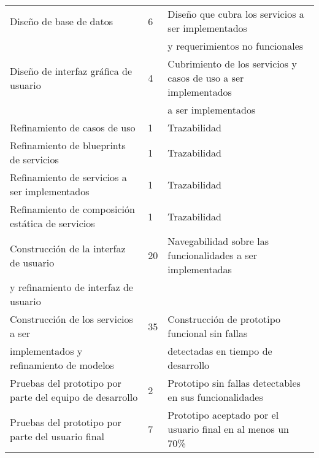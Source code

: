 \begin{table}[h]
\begin{center}
{\begin{tabular}{|l|l|l|}
        
        Diseño de base de datos & 6 & Diseño que cubra los servicios a ser implementados \\ 
        
         &  &  y requerimientos no funcionales \\ 
        
        Diseño de interfaz gráfica de usuario & 4 & Cubrimiento de los servicios y casos de uso a ser implementados \\ 
        
         &  &  a ser implementados \\ 
        
        Refinamiento de casos de uso & 1 & Trazabilidad \\ 
        
        Refinamiento de blueprints de servicios & 1 & Trazabilidad \\ 
        
        Refinamiento de servicios a ser implementados & 1 & Trazabilidad \\ 
        
        Refinamiento de composición estática de servicios & 1 & Trazabilidad \\ 
        
        Construcción de la interfaz de usuario & 20 & Navegabilidad sobre las funcionalidades a ser implementadas \\ 
        
        y refinamiento de interfaz de usuario &  &  \\ 
        
        Construcción de los servicios a ser  & 35 & Construcción de prototipo funcional sin fallas \\ 
        
        implementados y refinamiento de modelos &  & detectadas en tiempo de desarrollo \\ 
        
        Pruebas del prototipo por parte del equipo de desarrollo & 2 & Prototipo sin fallas detectables en sus funcionalidades \\ 
        
        Pruebas del prototipo por parte del usuario final & 7 & Prototipo aceptado por el usuario final en al menos un 70\% \\
        \hline

        \end{tabular}
    }
  \end{center}
\end{table}

